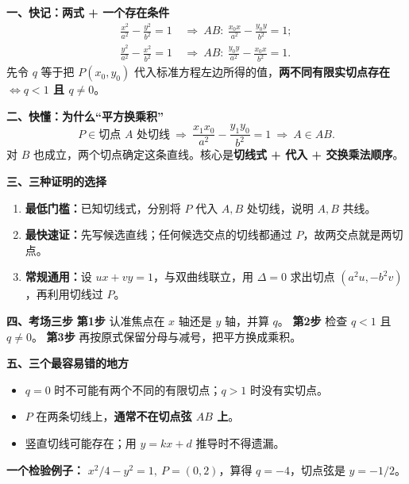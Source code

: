 \begin{summarybox}
\textbf{\textcolor{CSummary}{一、快记：两式 + 一个存在条件}}
\[
\boxed{\begin{aligned}
\frac{x^2}{a^2}-\frac{y^2}{b^2}=1
&\ \Longrightarrow\ AB:\ \frac{x_0x}{a^2}-\frac{y_0y}{b^2}=1;\\[3pt]
\frac{y^2}{a^2}-\frac{x^2}{b^2}=1
&\ \Longrightarrow\ AB:\ \frac{y_0y}{a^2}-\frac{x_0x}{b^2}=1.
\end{aligned}}
\]
先令 $q$ 等于把 $P(x_0,y_0)$ 代入标准方程左边所得的值，\textbf{两不同有限实切点存在 $\Longleftrightarrow q<1$ 且 $q\ne0$}。

\medskip
\textbf{\textcolor{CSummary}{二、快懂：为什么“平方换乘积”}}
\[
P\in\text{切点 $A$ 处切线}
\ \Longrightarrow\
\frac{x_1x_0}{a^2}-\frac{y_1y_0}{b^2}=1
\ \Longrightarrow\ A\in AB.
\]
对 $B$ 也成立，两个切点确定这条直线。核心是\textbf{切线式 + 代入 + 交换乘法顺序}。

\medskip
\begin{minipage}{\linewidth}
\textbf{\textcolor{CSummary}{三、三种证明的选择}}
\begin{enumerate}[leftmargin=*,itemsep=0.3em]
\item \textbf{最低门槛：}已知切线式，分别将 $P$ 代入 $A,B$ 处切线，说明 $A,B$ 共线。
\item \textbf{最快速证：}先写候选直线；任何候选交点的切线都通过 $P$，故两交点就是两切点。
\item \textbf{常规通用：}设 $ux+vy=1$，与双曲线联立，用 $\Delta=0$ 求出切点 $(a^2u,-b^2v)$，再利用切线过 $P$。
\end{enumerate}\end{minipage}


\medskip
\textbf{\textcolor{CSummary}{四、考场三步}}
\textbf{第1步} 认准焦点在 $x$ 轴还是 $y$ 轴，并算 $q$。\quad
\textbf{第2步} 检查 $q<1$ 且 $q\ne0$。\quad
\textbf{第3步} 再按原式保留分母与减号，把平方换成乘积。

\medskip
\textbf{\textcolor{CSummary}{五、三个最容易错的地方}}
\begin{itemize}[leftmargin=*,itemsep=0.25em]
\item $q=0$ 时不可能有两个不同的有限切点；$q>1$ 时没有实切点。
\item $P$ 在两条切线上，\textbf{通常不在切点弦 $AB$ 上}。
\item 竖直切线可能存在；用 $y=kx+d$ 推导时不得遗漏。
\end{itemize}

\textbf{一个检验例子：} $x^2/4-y^2=1,\ P=(0,2)$，算得 $q=-4$，切点弦是 $y=-1/2$。
\end{summarybox}
